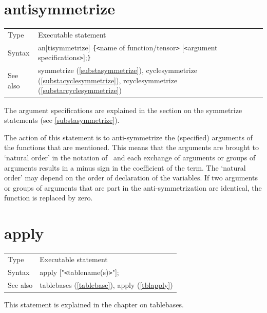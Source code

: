 
\section{antisymmetrize}
\label{substaantisymmetrize}

\noindent \begin{tabular}{ll}
Type & Executable statement\\
Syntax & an[tisymmetrize] \verb:{:{\tt<}name of function/tensor{\tt>}
         [{\tt<}argument specifications{\tt>}];\verb:}: \\
See also & symmetrize (\ref{substasymmetrize}), cyclesymmetrize 
(\ref{substacyclesymmetrize}), rcyclesymmetrize (\ref{substarcyclesymmetrize})
\end{tabular} \vspace{4mm}

\noindent The argument specifications are explained in the section on the 
symmetrize statements (see \ref{substasymmetrize}).\medskip

\noindent The action of this statement is to 
anti-symmetrize the (specified) arguments of the functions that are 
mentioned. This means that the arguments are brought to `natural order' in 
the notation of \FORM\ and each exchange of arguments or groups of arguments 
results in a minus sign in the coefficient of the term. The `natural order' 
may depend on the order of declaration of the variables. If two arguments 
or groups of arguments that are part in the anti-symmetrization are 
identical, the function is replaced by zero. \vspace{10mm}


\section{apply}
\label{substaapply}

\noindent \begin{tabular}{ll}
Type & Executable statement\\
Syntax & apply ["{\tt<}tablename(s){\tt>}"];
\\ See also & tablebases (\ref{tablebase}), apply (\ref{tblapply})
\end{tabular} \vspace{4mm}

\noindent This statement is explained in the chapter on 
tablebases.\vspace{10mm}

